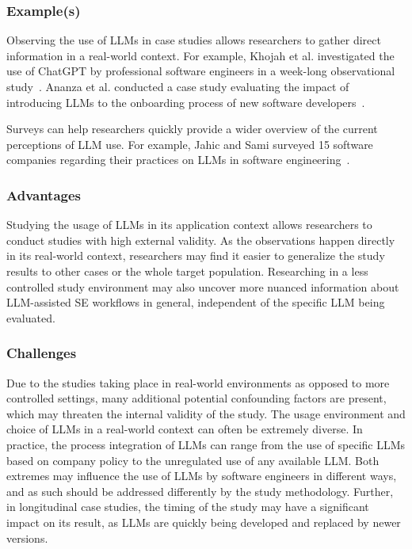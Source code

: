 \subsubsection{Example(s)}

Observing the use of LLMs in case studies allows researchers to gather direct information in a real-world context.
For example, Khojah et al. investigated the use of ChatGPT by professional software engineers in a week-long observational study~\cite{DBLP:journals/pacmse/KhojahM0N24}.
Ananza et al. conducted a case study evaluating the impact of introducing LLMs to the onboarding process of new software developers~\cite{DBLP:conf/csee/AzanzaPIG24}.

Surveys can help researchers quickly provide a wider overview of the current perceptions of LLM use.
For example, Jahic and Sami surveyed 15 software companies regarding their practices on LLMs in software engineering~\cite{DBLP:conf/icsa/JahicS24}.

\subsubsection{Advantages}

Studying the usage of LLMs in its application context allows researchers to conduct studies with high external validity.
As the observations happen directly in its real-world context, researchers may find it easier to generalize the study results to other cases or the whole target population.
Researching in a less controlled study environment may also uncover more nuanced information about LLM-assisted SE workflows in general, independent of the specific LLM being evaluated.

\subsubsection{Challenges}

Due to the studies taking place in real-world environments as opposed to more controlled settings, many additional potential confounding factors are present, which may threaten the internal validity of the study.
The usage environment and choice of LLMs in a real-world context can often be extremely diverse.
In practice, the process integration of LLMs can range from the use of specific LLMs based on company policy to the unregulated use of any available LLM. 
Both extremes may influence the use of LLMs by software engineers in different ways, and as such should be addressed differently by the study methodology.
Further, in longitudinal case studies, the timing of the study may have a significant impact on its result, as LLMs are quickly being developed and replaced by newer versions.

